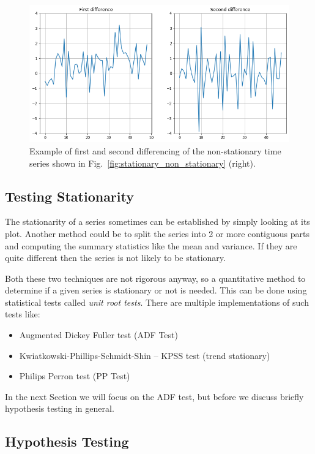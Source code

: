 \begin{figure}[htb]
	\centering
	\includegraphics[width=0.7\linewidth]{figures/first_second_differencing.png}
	\caption{Example of first and second differencing of the non-stationary time series shown in Fig.~\ref{fig:stationary_non_stationary} (right).}
	\label{fig:1st_2nd_differencing}
\end{figure}
    
\subsection{Testing Stationarity}\label{testing-stationarity}

The stationarity of a series sometimes can be established by simply looking at its plot. Another method could be to split the series into 2 or more contiguous parts and computing the summary statistics like the mean and variance. If they are quite different then the series is not likely to be stationary.

Both these two techniques are not rigorous anyway, so a quantitative method to determine if a given series is stationary or not is needed. This can be done using statistical tests called \emph{unit root tests}. There are multiple implementations of such tests like:

\begin{itemize}
\tightlist
\item
  Augmented Dickey Fuller test (ADF Test)
\item
  Kwiatkowski-Phillips-Schmidt-Shin -- KPSS test (trend stationary)
\item
  Philips Perron test (PP Test)
\end{itemize}

In the next Section we will focus on the ADF test, but before we discuss briefly hypothesis testing in general.

\subsection{Hypothesis Testing}\label{hypothesis-testing}

